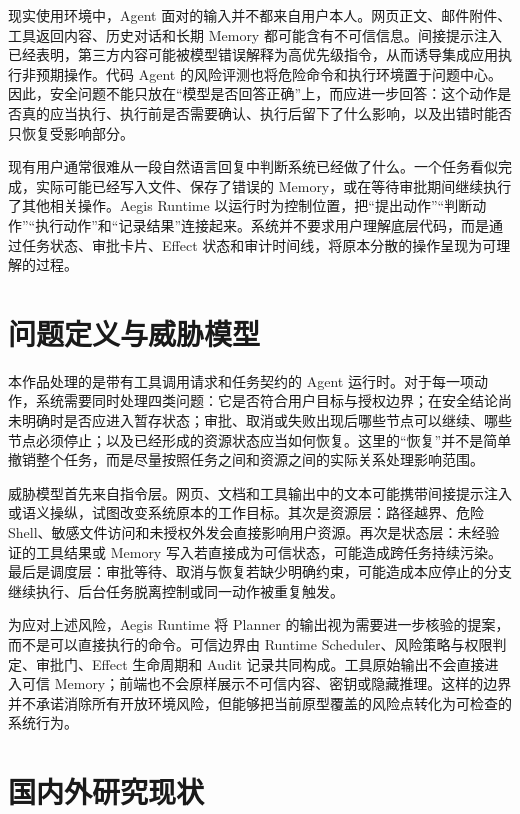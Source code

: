 现实使用环境中，Agent 面对的输入并不都来自用户本人。网页正文、邮件附件、工具返回内容、历史对话和长期 Memory 都可能含有不可信信息。间接提示注入已经表明，第三方内容可能被模型错误解释为高优先级指令，从而诱导集成应用执行非预期操作\cite{greshake2023indirect}。代码 Agent 的风险评测也将危险命令和执行环境置于问题中心\cite{guo2024redcode}。因此，安全问题不能只放在“模型是否回答正确”上，而应进一步回答：这个动作是否真的应当执行、执行前是否需要确认、执行后留下了什么影响，以及出错时能否只恢复受影响部分。

现有用户通常很难从一段自然语言回复中判断系统已经做了什么。一个任务看似完成，实际可能已经写入文件、保存了错误的 Memory，或在等待审批期间继续执行了其他相关操作。Aegis Runtime 以运行时为控制位置，把“提出动作”“判断动作”“执行动作”和“记录结果”连接起来。系统并不要求用户理解底层代码，而是通过任务状态、审批卡片、Effect 状态和审计时间线，将原本分散的操作呈现为可理解的过程。

\section{问题定义与威胁模型}

本作品处理的是带有工具调用请求和任务契约的 Agent 运行时。对于每一项动作，系统需要同时处理四类问题：它是否符合用户目标与授权边界；在安全结论尚未明确时是否应进入暂存状态；审批、取消或失败出现后哪些节点可以继续、哪些节点必须停止；以及已经形成的资源状态应当如何恢复。这里的“恢复”并不是简单撤销整个任务，而是尽量按照任务之间和资源之间的实际关系处理影响范围。

威胁模型首先来自指令层。网页、文档和工具输出中的文本可能携带间接提示注入或语义操纵，试图改变系统原本的工作目标。其次是资源层：路径越界、危险 Shell、敏感文件访问和未授权外发会直接影响用户资源。再次是状态层：未经验证的工具结果或 Memory 写入若直接成为可信状态，可能造成跨任务持续污染\cite{dash2026memorypoisoning}。最后是调度层：审批等待、取消与恢复若缺少明确约束，可能造成本应停止的分支继续执行、后台任务脱离控制或同一动作被重复触发\cite{khan2026stop}。

为应对上述风险，Aegis Runtime 将 Planner 的输出视为需要进一步核验的提案，而不是可以直接执行的命令。可信边界由 Runtime Scheduler、风险策略与权限判定、审批门、Effect 生命周期和 Audit 记录共同构成。工具原始输出不会直接进入可信 Memory；前端也不会原样展示不可信内容、密钥或隐藏推理。这样的边界并不承诺消除所有开放环境风险，但能够把当前原型覆盖的风险点转化为可检查的系统行为。

\section{国内外研究现状}

